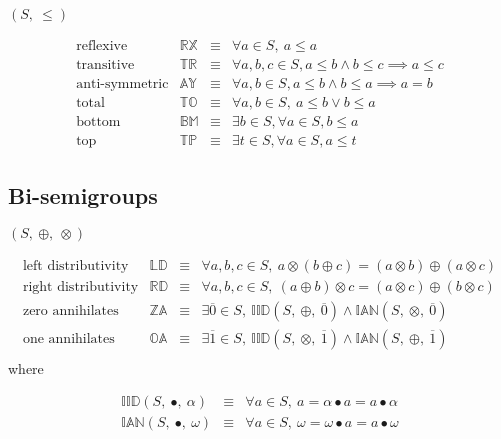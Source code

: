 \documentclass[10pt]{article}
\newcommand{\propname}[1]{{\mathbb{#1}}}
\begin{document}
$(S,\ \leq)$

\[ 
\begin{array}{c|ccl} 
\mbox{reflexive} 
   & \propname{RX} 
   & \equiv 
   & \forall a \in S,\ a \leq a 
   \\ 
\mbox{transitive}    
   & \propname{TR} 
   & \equiv 
   & \forall a, b, c \in S, a\leq b \wedge b \leq c \implies a \leq c 
   \\ 
\mbox{anti-symmetric} 
   & \propname{AY} 
   & \equiv 
   & \forall a, b\in S, a\leq b \wedge b \leq a \implies a = b
   \\ 
\mbox{total} 
   & \propname{TO} 
   & \equiv 
   & \forall a, b \in S,\ a\leq b \vee  b\leq a
   \\
\mbox{bottom}   
   & \propname{BM} 
   & \equiv 
   & \exists b \in S, \forall a \in S, b\leq a
   \\ 
\mbox{top}   
   & \propname{TP} 
   & \equiv 
   & \exists t \in S, \forall a \in S, a\leq t
\end{array} 
\] 


\subsection{Bi-semigroups}

$(S,\ \oplus,\ \otimes)$

\[ 
\begin{array}{c|ccl} 
\mbox{left distributivity} 
    & \propname{LD}
    & \equiv 
    & \forall a, b, c \in S,\ a\otimes(b \oplus c) =  (a\otimes b) \oplus (a\otimes c) \\ 
\mbox{right distributivity} 
    & \propname{RD}
    & \equiv 
    & \forall a, b, c \in S,\ (a\oplus b)\otimes c  =   (a\otimes c) \oplus (b\otimes c)\\ 
\mbox{zero annihilates} 
    & \propname{ZA}
    & \equiv 
    & \exists \overline{0} \in S,\ \propname{IID}(S,\ \oplus,\ \overline{0}) \wedge \propname{IAN}(S,\ \otimes,\ \overline{0})  \\ 
\mbox{one annihilates} 
    & \propname{OA}
    & \equiv 
    & \exists \overline{1} \in S,\ \propname{IID}(S,\ \otimes,\ \overline{1}) \wedge \propname{IAN}(S,\ \oplus,\ \overline{1})  \\ 
\end{array} 
\] 
where 

\[ 
\begin{array}{rcl} 
\propname{IID}(S,\ \bullet,\ \alpha)  
    & \equiv 
    & \forall a\in S,\ a = \alpha \bullet a = a \bullet \alpha\\ 
\propname{IAN}(S,\ \bullet,\ \omega)  
    & \equiv 
    & \forall a\in S,\ \omega = \omega \bullet a = a \bullet \omega\\ 
\end{array} 
\] 
\end{document}
